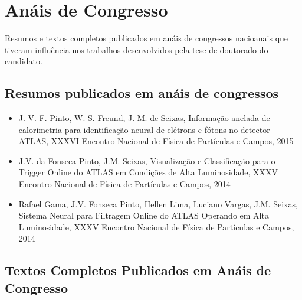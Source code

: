 
\section{Anáis de Congresso}

Resumos e textos completos publicados em anáis de congressos nacioanais que tiveram influência nos trabalhos desenvolvidos pela tese de doutorado do candidato.

\subsection{Resumos publicados em anáis de congressos}

\begin{itemize}
    \item J. V. F. Pinto, W. S. Freund, J. M. de Seixas, Informação anelada de calorimetria para identificação neural de elétrons e fótons no detector ATLAS, XXXVI Encontro Nacional de Física de Partículas e Campos, 2015

    \item J.V. da Fonseca Pinto, J.M. Seixas, Visualização e Classificação para o Trigger Online do ATLAS em Condições de Alta Luminosidade, XXXV Encontro Nacional de Física de Partículas e Campos, 2014

    \item Rafael Gama, J.V. Fonseca Pinto, Hellen Lima, Luciano Vargas, J.M. Seixas, Sistema Neural para Filtragem Online do ATLAS Operando em Alta Luminosidade, XXXV Encontro Nacional de Física de Partículas e Campos, 2014
\end{itemize}


\subsection{Textos Completos Publicados em Anáis de Congresso}

\nocite{*}
\printbibliography[keyword={completo_anais},heading=none]


